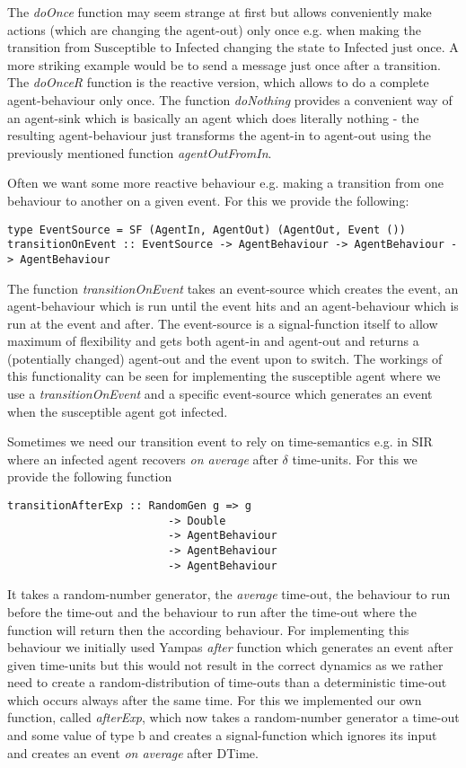 The \textit{doOnce} function may seem strange at first but allows conveniently make actions (which are changing the agent-out) only once e.g. when making the transition from Susceptible to Infected changing the state to Infected just once. A more striking example would be to send a message just once after a transition. The \textit{doOnceR} function is the reactive version, which allows to do a complete agent-behaviour only once. The function \textit{doNothing} provides a convenient way of an agent-sink which is basically an agent which does literally nothing - the resulting agent-behaviour just transforms the agent-in to agent-out using the previously mentioned function \textit{agentOutFromIn}.

Often we want some more reactive behaviour e.g. making a transition from one behaviour to another on a given event. For this we provide the following:

\begin{verbatim}
type EventSource = SF (AgentIn, AgentOut) (AgentOut, Event ())
transitionOnEvent :: EventSource -> AgentBehaviour -> AgentBehaviour -> AgentBehaviour
\end{verbatim}

The function \textit{transitionOnEvent} takes an event-source which creates the event, an agent-behaviour which is run until the event hits and an agent-behaviour which is run at the event and after. The event-source is a signal-function itself to allow maximum of flexibility and gets both agent-in and agent-out and returns a (potentially changed) agent-out and the event upon to switch. 
The workings of this functionality can be seen for implementing the susceptible agent where we use a \textit{transitionOnEvent} and a specific event-source which generates an event when the susceptible agent got infected.

Sometimes we need our transition event to rely on time-semantics e.g. in SIR where an infected agent recovers \textit{on average} after $\delta$ time-units. For this we provide the following function

\begin{verbatim}
transitionAfterExp :: RandomGen g => g
						 -> Double 
						 -> AgentBehaviour
						 -> AgentBehaviour
						 -> AgentBehaviour
\end{verbatim}

It takes a random-number generator, the \textit{average} time-out, the behaviour to run before the time-out and the behaviour to run after the time-out where the function will return then the according behaviour. For implementing this behaviour we initially used Yampas \textit{after} function which generates an event after given time-units but this would not result in the correct dynamics as we rather need to create a random-distribution of time-outs than a deterministic time-out which occurs always after the same time. For this we implemented our own function, called \textit{afterExp}, which now takes a random-number generator a time-out and some value of type b and creates a signal-function which ignores its input and creates an event \textit{on average} after DTime.

